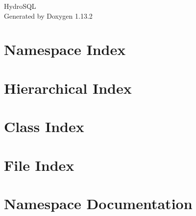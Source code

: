 \documentclass[twoside]{book}
\newcommand{\+}{\discretionary{\mbox{\scriptsize$\hookleftarrow$}}{}{}}
\newcommand{\clearemptydoublepage}{%
    \newpage{\pagestyle{empty}\cleardoublepage}%
  }
\begin{document}
  \raggedbottom
    \hypersetup{pageanchor=false,
                bookmarksnumbered=true,
                pdfencoding=unicode
               }
  \begin{titlepage}
  \vspace*{7cm}
  \begin{center}%
  {\Large Hydro\+SQL}\\
  \vspace*{1cm}
  {\large Generated by Doxygen 1.13.2}\\
  \end{center}
  \end{titlepage}
  \clearemptydoublepage
  \tableofcontents
  \clearemptydoublepage
  \hypersetup{pageanchor=true}
\chapter{Namespace Index}

\chapter{Hierarchical Index}

\chapter{Class Index}

\chapter{File Index}

\chapter{Namespace Documentation}










\end{document}

